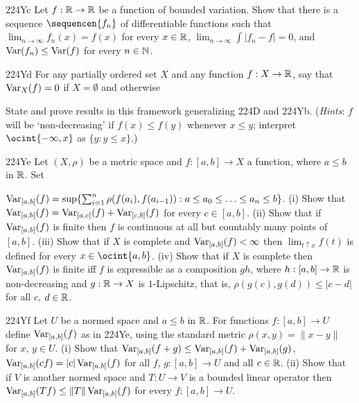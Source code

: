{\spheader 224Yc Let $f:\Bbb R\to\Bbb R$ be a function of bounded
variation.
Show that there is a sequence $\sequencen{f_n}$ of differentiable
functions
such that $\lim_{n\to\infty}f_n(x)=f(x)$ for every $x\in\Bbb R$,
$\lim_{n\to\infty}\int|f_n-f|=0$, and $\mathop{\text{Var}}(f_n)\le\mathop{\text{Var}}(f)$ for every
$n\in\Bbb N$.   

\spheader 224Yd For any partially ordered set $X$ and any
function $f:X\to\Bbb R$, say that $\mathop{\text{Var}}_X(f)=0$ if $X=\emptyset$ and
otherwise


\noindent State and prove results in this framework generalizing 224D
and 224Yb.   ({\it Hints\/}:  $f$ will be `non-decreasing' if
$f(x)\le f(y)$ whenever $x\le y$;  interpret $\ocint{-\infty,x}$ as
$\{y:y\le x\}$.)

\spheader 224Ye Let $(X,\rho)$ be a metric space and $f:[a,b]\to X$ a
function, where $a\le b$ in $\Bbb R$.   Set
\ifnum{}


\noindent\else
$\mathop{\text{Var}}_{[a,b]}(f)
=\sup\{\sum_{i=1}^n\rho(f(a_i),f(a_{i-1})):
a\le a_0\le\ldots\le a_n\le b\}$. \fi
(i) Show that
$\mathop{\text{Var}}_{[a,b]}(f)=\mathop{\text{Var}}_{[a,c]}(f)+\mathop{\text{Var}}_{[c,b]}(f)$ for every $c\in[a,b]$.
(ii) Show that if $\mathop{\text{Var}}_{[a,b]}(f)$ is finite
then $f$ is continuous at all but countably many points of $[a,b]$.
(iii) Show that if $X$ is complete and $\mathop{\text{Var}}_{[a,b]}(f)<\infty$ then
$\lim_{t\uparrow x}f(t)$ is defined for every $x\in\ocint{a,b}$.
(iv) Show that if $X$ is complete then
$\mathop{\text{Var}}_{[a,b]}(f)$ is finite iff $f$ is expressible as a
composition $gh$, where $h:[a,b]\to\Bbb R$ is non-decreasing and
$g:\Bbb R\to X$ is $1$-Lipschitz, that is,
$\rho(g(c),g(d))\le|c-d|$ for all $c$, $d\in\Bbb R$.

\spheader 224Yf Let $U$ be a normed space and $a\le b$ in $\Bbb R$.
For functions $f:[a,b]\to U$ define $\mathop{\text{Var}}_{[a,b]}(f)$ as in 224Ye, using
the standard metric $\rho(x,y)=\|x-y\|$ for $x$, $y\in U$.    (i) Show
that $\mathop{\text{Var}}_{[a,b]}(f+g)\le\mathop{\text{Var}}_{[a,b]}(f)+\mathop{\text{Var}}_{[a,b]}(g)$,
$\mathop{\text{Var}}_{[a,b]}(cf)=|c|\mathop{\text{Var}}_{[a,b]}(f)$ for all $f$, $g:[a,b]\to U$ and
all $c\in\Bbb R$.   (ii) Show that if $V$ is another normed space and
$T:U\to V$ is a bounded linear operator then
$\mathop{\text{Var}}_{[a,b]}(Tf)\le\|T\|\mathop{\text{Var}}_{[a,b]}(f)$ for every $f:[a,b]\to U$.

}
